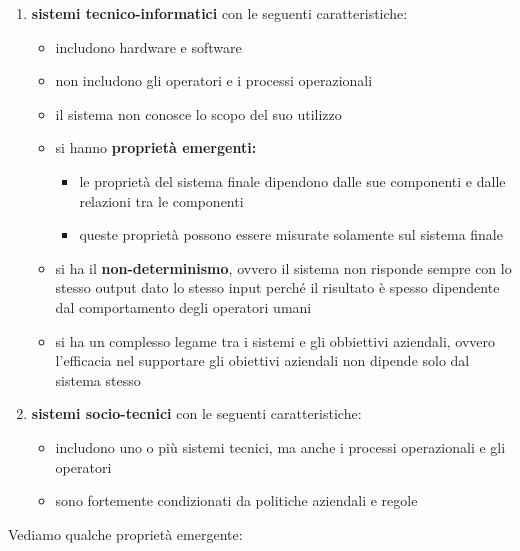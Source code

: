 \documentclass[a4paper,12pt, oneside]{book}
\begin{document}
\begin{enumerate}
    \item \textbf{sistemi tecnico-informatici} con le seguenti caratteristiche:
    \begin{itemize}
        \item includono hardware e software
        \item non includono gli operatori e i processi operazionali
        \item il sistema non conosce lo scopo del suo utilizzo
        \item si hanno \textbf{proprietà emergenti:}
        \begin{itemize}
            \item le proprietà del sistema finale dipendono dalle sue componenti e dalle relazioni tra le componenti
            \item queste proprietà possono essere misurate solamente sul sistema finale
        \end{itemize}
        \item si ha il \textbf{non-determinismo}, ovvero il sistema non risponde sempre con lo stesso output dato lo
              stesso input perché il risultato è spesso dipendente dal comportamento degli operatori umani
        \item si ha un complesso legame tra i sistemi e gli obbiettivi aziendali, ovvero l'efficacia nel supportare
                gli obiettivi aziendali non dipende solo dal sistema stesso
    \end{itemize}
    \item \textbf{sistemi socio-tecnici} con le seguenti caratteristiche:
    \begin{itemize}
        \item includono uno o più sistemi tecnici, ma anche i processi operazionali e gli operatori
        \item sono fortemente condizionati da politiche aziendali e regole
\end{itemize}
\end{enumerate}
\newpage
Vediamo qualche proprietà emergente:
\end{document}
